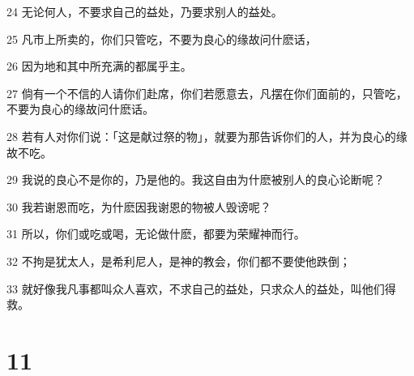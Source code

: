 \par 24 无论何人，不要求自己的益处，乃要求别人的益处。
\par 25 凡市上所卖的，你们只管吃，不要为良心的缘故问什麽话，
\par 26 因为地和其中所充满的都属乎主。
\par 27 倘有一个不信的人请你们赴席，你们若愿意去，凡摆在你们面前的，只管吃，不要为良心的缘故问什麽话。
\par 28 若有人对你们说：「这是献过祭的物」，就要为那告诉你们的人，并为良心的缘故不吃。
\par 29 我说的良心不是你的，乃是他的。我这自由为什麽被别人的良心论断呢？
\par 30 我若谢恩而吃，为什麽因我谢恩的物被人毁谤呢？
\par 31 所以，你们或吃或喝，无论做什麽，都要为荣耀神而行。
\par 32 不拘是犹太人，是希利尼人，是神的教会，你们都不要使他跌倒；
\par 33 就好像我凡事都叫众人喜欢，不求自己的益处，只求众人的益处，叫他们得救。

\chapter{11}

